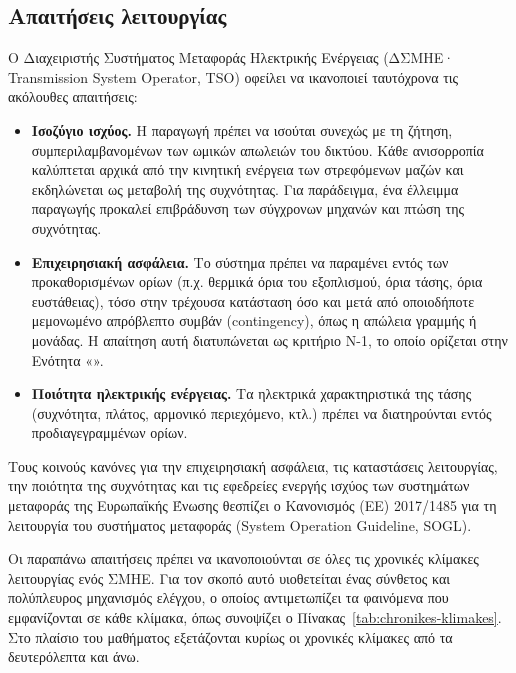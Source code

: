 

\subsection{Απαιτήσεις λειτουργίας}

Ο Διαχειριστής Συστήματος Μεταφοράς Ηλεκτρικής Ενέργειας (ΔΣΜΗΕ· Transmission System
Operator, TSO) οφείλει να
ικανοποιεί ταυτόχρονα τις ακόλουθες απαιτήσεις:

\begin{itemize}
\item \textbf{Ισοζύγιο ισχύος.} Η παραγωγή πρέπει να ισούται συνεχώς με τη ζήτηση, συμπεριλαμβανομένων των ωμικών απωλειών του δικτύου. Κάθε ανισορροπία καλύπτεται αρχικά από την κινητική ενέργεια των στρεφόμενων μαζών και εκδηλώνεται ως μεταβολή της συχνότητας. Για παράδειγμα, ένα
      έλλειμμα παραγωγής προκαλεί επιβράδυνση των σύγχρονων μηχανών και πτώση της συχνότητας.
\item \textbf{Επιχειρησιακή ασφάλεια.} Το σύστημα πρέπει να παραμένει εντός των προκαθορισμένων ορίων (π.χ. θερμικά όρια του εξοπλισμού, όρια τάσης, όρια ευστάθειας), τόσο στην τρέχουσα κατάσταση όσο και μετά από οποιοδήποτε μεμονωμένο απρόβλεπτο συμβάν (contingency), όπως η απώλεια γραμμής ή μονάδας. Η απαίτηση αυτή διατυπώνεται ως κριτήριο N-1, το οποίο ορίζεται στην Ενότητα
      «».
\item \textbf{Ποιότητα ηλεκτρικής ενέργειας.} Τα ηλεκτρικά χαρακτηριστικά της τάσης (συχνότητα, πλάτος, αρμονικό περιεχόμενο, κτλ.) πρέπει να
      διατηρούνται εντός προδιαγεγραμμένων ορίων.
\end{itemize}

Τους κοινούς κανόνες για την επιχειρησιακή ασφάλεια, τις καταστάσεις λειτουργίας, την ποιότητα
της συχνότητας και τις εφεδρείες ενεργής ισχύος των συστημάτων μεταφοράς της Ευρωπαϊκής Ένωσης
θεσπίζει ο Κανονισμός (ΕΕ) 2017/1485 για τη λειτουργία του συστήματος μεταφοράς (System
Operation Guideline, SOGL).

Οι παραπάνω απαιτήσεις πρέπει να ικανοποιούνται σε όλες τις χρονικές κλίμακες λειτουργίας ενός
ΣΜΗΕ. Για τον σκοπό αυτό υιοθετείται ένας σύνθετος και πολύπλευρος μηχανισμός ελέγχου, ο οποίος
αντιμετωπίζει τα φαινόμενα που εμφανίζονται σε κάθε κλίμακα, όπως συνοψίζει ο
Πίνακας~\ref{tab:chronikes-klimakes}. Στο πλαίσιο του μαθήματος εξετάζονται κυρίως οι χρονικές
κλίμακες από τα δευτερόλεπτα και άνω.

